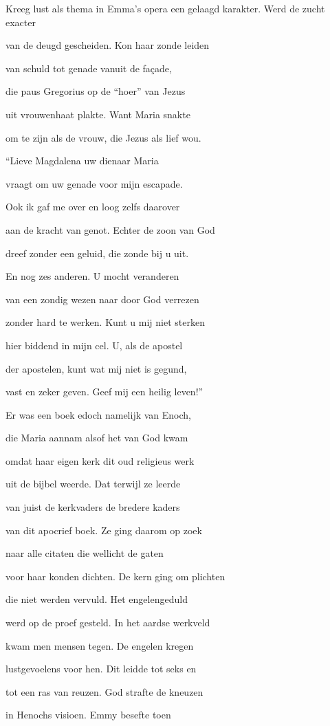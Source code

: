 Kreeg lust als thema
in Emma’s opera
een gelaagd karakter.
Werd de zucht exacter

van de deugd gescheiden.
Kon haar zonde leiden

van schuld tot genade
vanuit de façade,

die paus Gregorius
op de “hoer” van Jezus

uit vrouwenhaat plakte.
Want Maria snakte

om te zijn als de vrouw,
die Jezus als lief wou.

“Lieve Magdalena
uw dienaar Maria

vraagt om uw genade
voor mijn escapade.

Ook ik gaf me over
en loog zelfs daarover

aan de kracht van genot.
Echter de zoon van God

dreef zonder een geluid,
die zonde bij u uit.

En nog zes anderen.
U mocht veranderen

van een zondig wezen
naar door God verrezen

zonder hard te werken.
Kunt u mij niet sterken

hier biddend in mijn cel.
U, als de apostel

der apostelen, kunt
wat mij niet is gegund,

vast en zeker geven.
Geef mij een heilig leven!”

Er was een boek edoch
namelijk van Enoch,

die Maria aannam
alsof het van God kwam

omdat haar eigen kerk
dit oud religieus werk

uit de bijbel weerde.
Dat terwijl ze leerde

van juist de kerkvaders
de bredere kaders

van dit apocrief boek.
Ze ging daarom op zoek

naar alle citaten
die wellicht de gaten

voor haar konden dichten.
De kern ging om plichten

die niet werden vervuld.
Het engelengeduld

werd op de proef gesteld.
In het aardse werkveld

kwam men mensen tegen.
De engelen kregen

lustgevoelens voor hen.
Dit leidde tot seks en

tot een ras van reuzen.
God strafte de kneuzen

in Henochs visioen.
Emmy besefte toen

